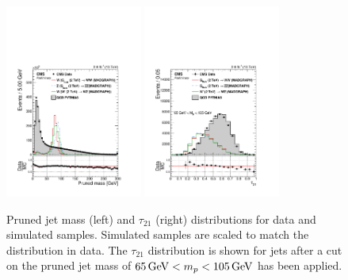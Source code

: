 \begin{figure}[h!]
\centering
\includegraphics[width=0.4\textwidth]{figures/analysis/search1/AN-15-211/controlplots/silverjson/PrunedMass_WSignal.pdf}
\includegraphics[width=0.4\textwidth]{figures/analysis/search1/AN-15-211/controlplots/silverjson/Tau21_punzi_WSignal.pdf}\\
\caption{Pruned jet mass (left) and $\tau_{21}$ (right) distributions for data and simulated samples. Simulated samples are scaled to match the distribution in data. The $\tau_{21}$ distribution is shown for jets after a cut on the pruned jet mass of $65 {\,\text{Ge\hspace{-.08em}V}} < m_{p} < 105 {\,\text{Ge\hspace{-.08em}V}}$ has been applied.}
\label{fig:wtag}
\end{figure}


